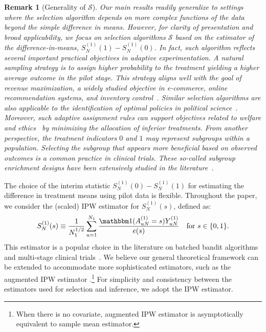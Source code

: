 \documentclass[12pt]{article}
\newtheorem{remark}{Remark}
\newcommand{\indicator}{\mathbbm 1}						%
\begin{document}
\begin{remark}[Generality of $\mathcal{S}$]
	Our main results readily generalize to settings where the selection algorithm depends on more complex functions of the data beyond the simple difference in means. However, for clarity of presentation and broad applicability, we focus on selection algorithms $\mathcal{S}$ based on the estimator of the difference-in-means, \( S_N^{(1)}(1) - S_N^{(1)}(0) \). In fact, such algorithm reflects several important practical objectives in adaptive experimentation. A natural sampling strategy is to assign higher probability to the treatment yielding a higher average outcome in the pilot stage. This strategy aligns well with the goal of revenue maximization, a widely studied objective in e-commerce, online recommendation systems, and inventory control~\citep{bakshy2018ae,che2024optimization}. Similar selection algorithms are also applicable to the identification of optimal policies in political science~\citep{offer2021adaptive}. Moreover, such adaptive assignment rules can support objectives related to welfare and ethics~\citep{burnett2020adding} by minimizing the allocation of inferior treatments. From another perspective, the treatment indicators \(0\) and \(1\) may represent subgroups within a population. Selecting the subgroup that appears more beneficial based on observed outcomes is a common practice in clinical trials. These so-called \emph{subgroup enrichment designs} have been extensively studied in the literature~\citep{magnusson2013group,tanniou2016subgroup,lin2021inference}.
\end{remark}

The choice of the interim statistic $S_N^{(1)}(0)-S_N^{(1)}(1)$ for estimating the difference in treatment means using pilot data is flexible. Throughout the paper, we consider the (scaled) IPW estimator for \( S_N^{(1)}(s) \), defined as:
\begin{align}\label{eq:definition_selection_stat}
	S_N^{(1)}(s) \equiv \frac{1}{N_1^{1/2}} \sum_{u=1}^{N_1} \frac{\indicator(A_{uN}^{(1)} = s) Y_{uN}^{(1)}}{e(s)}\quad\text{for } s \in \{0, 1\}.
\end{align}
This estimator is a popular choice in the literature on batched bandit algorithms \citep{pmlr-v32-agarwalb14,dimakopoulou2017estimation} and 
multi-stage clinical trials~\citep{shen2014inverse,bowden2017unbiased}. We believe our general theoretical framework can be extended to accommodate more sophisticated estimators, such as the augmented IPW estimator \citep{dimakopoulou2021online}.\footnote{When there is no covariate, augmented IPW estimator is asymptotically equivalent to sample mean estimator.} For simplicity and consistency between the estimators used for selection and inference, we adopt the IPW estimator.
\end{document}
